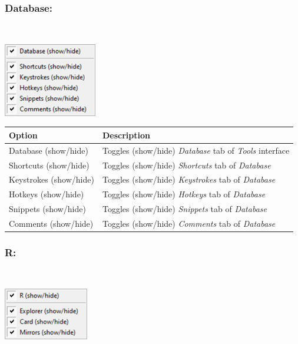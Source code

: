 \hypertarget{menu_view_tools_resources_database}{}
\subsubsection{Database:}\\

\includegraphics[scale=0.50]{./res/menu_view_tools_resources_database.png}\\

\begin{scriptsize}
  \begin{tabularx}{\textwidth}{>{\hsize=0.3\hsize}X>{\hsize=0.7\hsize}X}\\
    \hline
    \textbf{Option} & \textbf{Description} \\
    \hline
    Database (show/hide) & Toggles (show/hide) \textit{Database} tab of \textit{Tools} interface \\
    \hdashline[1pt/1pt]
    Shortcuts (show/hide) & Toggles (show/hide) \textit{Shortcuts} tab of \textit{Database} \\
    Keystrokes (show/hide) & Toggles (show/hide) \textit{Keystrokes} tab of \textit{Database} \\
    Hotkeys (show/hide) & Toggles (show/hide) \textit{Hotkeys} tab of \textit{Database} \\
    Snippets (show/hide) & Toggles (show/hide) \textit{Snippets} tab of \textit{Database} \\
    Comments (show/hide) & Toggles (show/hide) \textit{Comments} tab of \textit{Database} \\
    \hline
  \end{tabularx}
\end{scriptsize}


\hypertarget{menu_view_tools_resources_r}{}
\subsubsection{R:}\\

\includegraphics[scale=0.50]{./res/menu_view_tools_resources_r.png}\\


